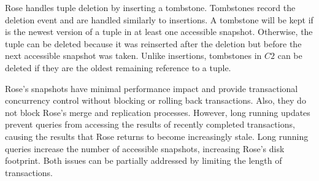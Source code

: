 \documentclass{vldb}
\newcommand{\rows}{Rose\xspace}
\newcommand{\rowss}{Rose's\xspace}
\begin{document}
\rows handles tuple deletion by inserting a tombstone.  Tombstones
record the deletion event and are handled similarly to insertions.  A
tombstone will be kept if is the newest version of a tuple in at least one
accessible snapshot.  Otherwise, the tuple can be deleted because it
 was reinserted after the deletion but before the next accessible
snapshot was taken.  Unlike insertions, tombstones in
$C2$ can be deleted if they are the oldest remaining reference to a tuple.




\rowss snapshots have minimal performance impact and provide
transactional concurrency control without blocking or rolling back
transactions.  Also, they do not block \rowss merge and replication
processes.  However, long running updates prevent queries from
accessing the results of recently completed transactions, causing the
results that \rows returns to become increasingly stale.  Long running
queries increase the number of accessible snapshots, increasing \rowss
disk footprint.  Both issues can be partially addressed by limiting
the length of transactions.
\end{document}
